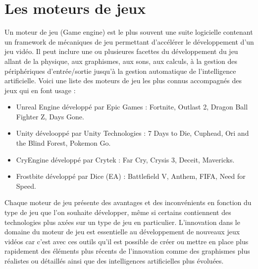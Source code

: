 \section{Les moteurs de jeux}
Un moteur de jeu (Game engine) est le plus souvent une suite logicielle contenant un framework de mécaniques de jeu permettant d'accélérer le développement d'un jeu vidéo. Il peut inclure une ou plusieures facettes du développement du jeu allant de la physique, aux graphismes, aux sons, aux calculs, à la gestion des périphériques d'entrée/sortie jusqu'à la gestion automatique de l'intelligence artificielle. Voici une liste des moteurs de jeu les plus connus accompagnés des jeux qui en font usage : 
\begin{itemize}
    \item Unreal Engine développé par Epic Games : Fortnite, Outlast 2, Dragon Ball Fighter Z, Days Gone.
    \item Unity dévelooppé par Unity Technologies : 7 Days to Die, Cuphead, Ori and the Blind Forest, Pokemon Go.
    \item CryEngine développé par Crytek : Far Cry, Crysis 3, Deceit, Mavericks.
    \item Frostbite développé par Dice (EA) : Battlefield V, Anthem, FIFA, Need for Speed.
\end{itemize}

Chaque moteur de jeu présente des avantages et des inconvénients en fonction du type de jeu que l'on souhaite développer, même si certains contiennent des technologies plus axées sur un type de jeu en particulier. L'innovation dans le domaine du moteur de jeu est essentielle au développement de nouveaux jeux vidéos car c'est avec ces outils qu'il est possible de créer ou mettre en place plus rapidement des éléments plus récents de l'innovation comme des graphismes plus réalistes ou détaillés ainsi que des intelligences artificielles plus évoluées.

